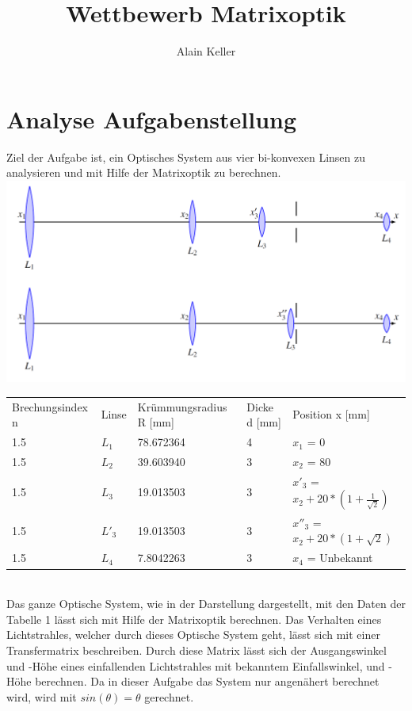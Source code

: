 \documentclass[11pt,twoside,a4paper]{article}
\title{Wettbewerb Matrixoptik}
\author{Alain Keller}
\begin{document}
	\maketitle
	\section{Analyse Aufgabenstellung}
	Ziel der Aufgabe ist, ein Optisches System aus vier bi-konvexen Linsen zu analysieren und mit Hilfe der Matrixoptik zu berechnen. \\
	\includegraphics[scale=.25]{./system.PNG}
	\begin{table}
		\centering
		\begin{tabular}{lllll}
			Brechungsindex n & Linse & Krümmungsradius R [mm]& Dicke d [mm] & Position x [mm] \\
			1.5 & \(L_{1}\) & 78.672364 & 4 & \(x_{1}\) = 0 \\
			1.5 & \(L_{2}\) & 39.603940 & 3 & \(x_{2}\) = 80 \\
			1.5 & \(L_{3}\) & 19.013503 & 3 & \(x'_{3}\) = \(x_{2} + 20 * (1+\frac{1}{\sqrt{2}})\)  \\
			1.5 & \(L'_{3}\) & 19.013503 & 3 & \(x''_{3}\) = \(x_{2} + 20 * (1+\sqrt{2})\) \\
			1.5 & \(L_{4}\) & 7.8042263 & 3 & \(x_{4}\) = Unbekannt \\
		\end{tabular}
	\end{table} \\
	Das ganze Optische System, wie in der Darstellung dargestellt, mit den Daten der Tabelle 1 lässt sich mit Hilfe der Matrixoptik berechnen. Das Verhalten eines Lichtstrahles, welcher durch dieses Optische System geht, lässt sich mit einer Transfermatrix beschreiben. Durch diese Matrix lässt sich der Ausgangswinkel und -Höhe eines einfallenden Lichtstrahles mit bekanntem Einfallswinkel, und -Höhe berechnen. Da in dieser Aufgabe das System nur angenähert berechnet wird, wird mit \(sin(\theta) = \theta\) gerechnet.
\end{document}
